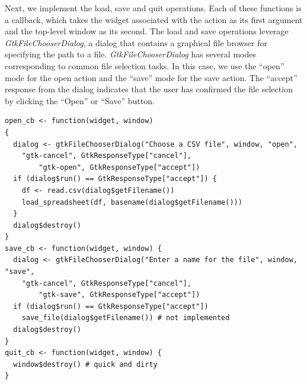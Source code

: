 \documentclass[article]{jss}
\begin{document}
Next, we implement the 
load, save and quit operations. Each of these functions is a callback, which
takes the widget associated with the action as its first argument and
the top-level window as its second. The load and save operations leverage
\emph{GtkFileChooserDialog}, a dialog that contains a graphical file browser 
for specifying the path to a file. \emph{GtkFileChooserDialog}
has several modes corresponding to common file selection tasks. In this case, 
we use the ``open'' mode for the open action and the ``save'' mode for
the save action. The ``accept'' response from the dialog indicates that the user
has confirmed the file selection by clicking the ``Open'' or ``Save'' button.
\begin{verbatim}
open_cb <- function(widget, window)  
{
  dialog <- gtkFileChooserDialog("Choose a CSV file", window, "open",
    "gtk-cancel", GtkResponseType["cancel"],
		"gtk-open", GtkResponseType["accept"])
  if (dialog$run() == GtkResponseType["accept"]) {
    df <- read.csv(dialog$getFilename())
    load_spreadsheet(df, basename(dialog$getFilename()))
  }
  dialog$destroy()
}
save_cb <- function(widget, window) {
  dialog <- gtkFileChooserDialog("Enter a name for the file", window, "save",
    "gtk-cancel", GtkResponseType["cancel"],
		"gtk-save", GtkResponseType["accept"])
  if (dialog$run() == GtkResponseType["accept"])
    save_file(dialog$getFilename()) # not implemented
  dialog$destroy()
}
quit_cb <- function(widget, window) {
  window$destroy() # quick and dirty
}
\end{verbatim}
\end{document}
